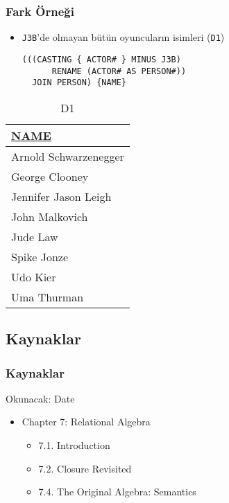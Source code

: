 \documentclass[dvipsnames]{beamer}
\theoremstyle{plain}
\begin{document}
\begin{frame}[fragile]
  \frametitle{Fark Örneği}

    \begin{itemize}
      \item \texttt{J3B}'de olmayan bütün oyuncuların isimleri (\texttt{D1})

    \begin{lstlisting}
(((CASTING { ACTOR# } MINUS J3B)
      RENAME (ACTOR# AS PERSON#))
  JOIN PERSON) {NAME}
    \end{lstlisting}
    \end{itemize}

    \vspace{-10pt}
\begin{tiny}
  \begin{table}
    \caption{D1}
    \begin{tabular}{|l|}\hline
\underline{NAME}     \\[2pt]\hline\hline
Arnold Schwarzenegger\\\hline
George Clooney       \\\hline
Jennifer Jason Leigh \\\hline
John Malkovich       \\\hline
Jude Law             \\\hline
Spike Jonze          \\\hline
Udo Kier             \\\hline
Uma Thurman          \\\hline
    \end{tabular}
  \end{table}
  \end{tiny}
\end{frame}

\subsection*{Kaynaklar}

\begin{frame}
  \frametitle{Kaynaklar}

  \begin{block}{Okunacak: Date}
    \begin{itemize}
      \item Chapter 7: Relational Algebra
      \begin{itemize}
        \item 7.1. \alert{Introduction}
        \item 7.2. \alert{Closure Revisited}
        \item 7.4. \alert{The Original Algebra: Semantics}
      \end{itemize}
    \end{itemize}
  \end{block}
\end{frame}
\end{document}
